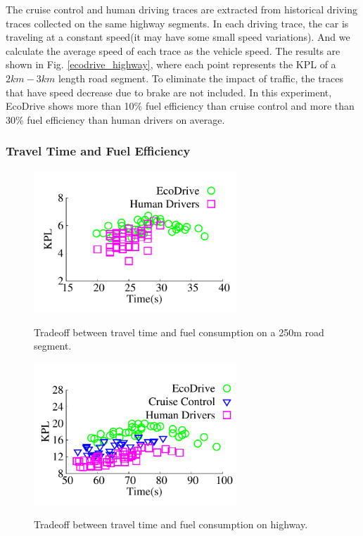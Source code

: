 The cruise control and human driving traces are extracted from 
historical driving traces collected on the same highway segments. 
In each driving trace, the car is traveling at a
constant speed(it may have some small speed variations). And we calculate the average speed of each trace as the vehicle speed.
The results are shown in Fig. \ref{ecodrive_highway}, where
each point represents the KPL of a $2km-3km$ length road segment. 
To eliminate the impact of traffic, the traces that 
have speed decrease due to brake are not included. 
In this experiment, EcoDrive shows more than 10\% fuel efficiency than cruise control
and more than 30\% fuel efficiency than human drivers on average. 



\subsubsection{Travel Time and Fuel Efficiency}



\begin{figure}[ht]
\begin{center}
\vspace{-0.4cm}
\includegraphics[width=3.0in,angle=0]{Figs/EcoDrive/evaluation/urban_timekpl.pdf}
\vspace{-0.0cm}
\caption{Tradeoff between travel time and fuel consumption on a 250m road segment.}
\vspace{-0.6cm}
\label{tradeoff_urban}
\end{center}
\end{figure}

\begin{figure}[ht]
\begin{center}
\vspace{-0.4cm}
\includegraphics[width=3.0in,angle=0]{Figs/EcoDrive/evaluation/highway_timekpl.pdf}
\vspace{-0.0cm}
\caption{Tradeoff between travel time and fuel consumption on highway.}
\vspace{-0.6cm}
\label{tradeoff_highway}
\end{center}
\end{figure}

